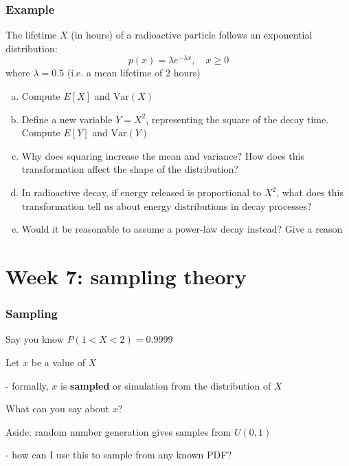 \documentclass[t,8pt]{beamer}%
\begin{document}
\begin{frame}
	\frametitle{Example}
	The lifetime \( X \) (in hours) of a radioactive particle follows an exponential distribution:
\[
p(x) = \lambda e^{-\lambda x}, \quad x \geq 0
\]
where \( \lambda = 0.5 \) (i.e. a mean lifetime of 2 hours)
\begin{enumerate}[(a)]
    \item Compute \( E[X] \) and \( \text{Var}(X) \)
    \item Define a new variable \( Y = X^2 \), representing the square of the decay time. Compute \( E[Y] \) and \( \text{Var}(Y) \)
    \item Why does squaring increase the mean and variance? How does this transformation affect the shape of the distribution?
    \item In radioactive decay, if energy released is proportional to $X^2$, what does this transformation tell us about energy distributions in decay processes?
    \item Would it be reasonable to assume a power-law decay instead? Give a reason
\end{enumerate}

\end{frame}


\section{Week 7: sampling theory}


\begin{frame}
	\frametitle{Sampling}
	Say you know $P(1<X<2)=0.9999$ \par
        Let $x$ be a value of $X$ \par
        - formally, $x$ is {\bf sampled} or simulation from the distribution of $X$ \par
        What can you say about $x$? \par
        \vspace{10pt}
        Aside: random number generation gives samples from $U(0,1)$ \par
        - how can I use this to sample from any known PDF?
\end{frame}
\end{document}
